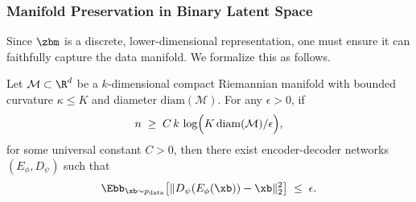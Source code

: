 \documentclass[11pt,letterpaper]{article}
\begin{document}
\subsubsection{Manifold Preservation in Binary Latent Space}

Since $\zbm$ is a discrete, lower-dimensional representation, one must ensure it can faithfully capture the data manifold. We formalize this as follows.

\begin{theorem}
\label{thm:manifold-preservation}
Let $\mathcal{M} \subset \R^d$ be a $k$-dimensional compact Riemannian manifold with bounded curvature $\kappa \le K$ and diameter $\mathrm{diam}(\mathcal{M})$. For any $\epsilon > 0$, if
\[
n \;\ge\; C\,k\,\log\Bigl(K\,\mathrm{diam}(\mathcal{M}) / \epsilon\Bigr),
\]
for some universal constant $C>0$, then there exist encoder-decoder networks $(E_\phi, D_\psi)$ such that
\[
\Ebb_{\xb \sim p_{\text{data}}}\bigl[\|D_\psi(E_\phi(\xb)) - \xb\|_2^2\bigr] \;\le\; \epsilon.
\]
\end{theorem}
\end{document}
